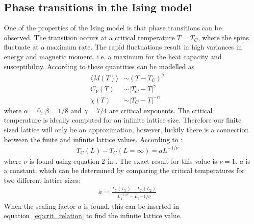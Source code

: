 \documentclass[aps,reprint]{revtex4-1}
\newcommand{\mean}[1]{\langle #1 \rangle}
\begin{document}
\subsection{Phase transitions in the Ising model} \label{sec:phase transitions analytic}
One of the properties of the Ising model is that phase transitions can be
observed. The transition occurs at a critical temperature $T = T_C$, where
the spins fluctuate at a maximum rate. The rapid fluctuations result in high
variances in energy and magnetic moment, i.e. a maximum for the heat capacity
and susceptibility. According to \cite{project4} these quantities can be
modelled as
\begin{align*}
  \mean{M(T)} &\sim (T - T_C)^\beta \\
  C_V(T) &\sim |T_C - T|^\gamma \\
  \chi (T) &\sim |T_C - T|^{-\alpha}
\end{align*}
where $\alpha = 0$, $\beta = 1/8$ and $\gamma = 7/4$ are critical exponents.
The critical temperature is ideally computed for an infinite lattice size. Therefore
our finite sized lattice will only be an approximation, however, luckily there is
a connection between the finite and infinite lattice values. According to
\cite{project4}:
\begin{align}\label{eq:crit_relation}
  T_C(L) - T_C(L = \infty) = a L^{-1/\nu}
\end{align}
where $\nu$ is found using equation 2 in \cite{project4}. The exact result for
this value is $\nu = 1$. $a$ is a constant, which can be determined by comparing
the critical temperatures for two different lattice sizes:
\begin{align}\label{eq:scalingfactor}
  a = \frac{T_C(L_1) - T_C(L_2)}{L_1^{-1/\nu} - L_2{-1/\nu}}
\end{align}
When the scaling factor $a$ is found, this can be inserted in equation~\ref{eq:crit_relation}
to find the infinite lattice value.
\end{document}
